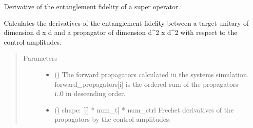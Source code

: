 \documentclass[letterpaper,10pt,english]{sphinxmanual}
\begin{document}
\begin{fulllineitems}
\label{\detokenize{qsim:qsim.cost_functions.deriv_entanglement_fid_sup_op_with_du}}
Derivative of the entanglement fidelity of a super operator.

Calculates the derivatives of the entanglement fidelity between a target
unitary of dimension d x d and a propagator of dimension d\textasciicircum{}2 x d\textasciicircum{}2 with
respect to the control amplitudes.
\begin{quote}\begin{description}
\item[{Parameters}] \leavevmode\begin{itemize}
\item {} 
 (\sphinxstyleliteralemphasis{\sphinxupquote{{[}}}\sphinxstyleliteralemphasis{\sphinxupquote{{]}}}\sphinxstyleliteralemphasis{\sphinxupquote{, }}) \textendash{} The forward propagators calculated in the systems simulation.
forward\_propagators{[}i{]} is the ordered sum of the propagators i..0 in
descending order.

\item {} 
 (\sphinxstyleliteralemphasis{\sphinxupquote{{[}}}\sphinxstyleliteralemphasis{\sphinxupquote{{[}}}\sphinxstyleliteralemphasis{\sphinxupquote{{]}}}\sphinxstyleliteralemphasis{\sphinxupquote{{]}}}\sphinxstyleliteralemphasis{\sphinxupquote{,}}) \textendash{} shape: {[}{[}{]} * num\_t{]} * num\_ctrl
Frechet derivatives of the propagators by the control amplitudes.


\end{itemize}
\end{description}
\end{quote}
\end{fulllineitems}
\end{document}
